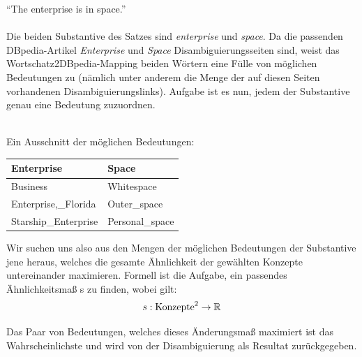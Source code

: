 \begin{bsp}
"`The enterprise is in space."'\\
~\\
Die beiden Substantive des Satzes sind \emph{enterprise} und \emph{space}.
Da die passenden DBpedia-Artikel \emph{Enterprise} und \emph{Space} Disambiguierungsseiten sind, weist das Wortschatz2DBpedia-Mapping beiden Wörtern eine Fülle von möglichen Bedeutungen zu (nämlich unter anderem die Menge der 
auf diesen Seiten vorhandenen Disambiguierungslinks).
Aufgabe ist es nun, jedem der Substantive genau eine Bedeutung zuzuordnen.

~\\
Ein Ausschnitt der möglichen Bedeutungen:
\begin{center}
\begin{tabular}{ll}
\toprule
Enterprise&		Space\\
\midrule
Business&		Whitespace\\
Enterprise,\_Florida&	Outer\_space\\
Starship\_Enterprise&	Personal\_space\\
\bottomrule
\end{tabular}
\end{center}

\end{bsp}

Wir suchen uns also aus den Mengen der möglichen Bedeutungen der Substantive jene heraus, welches die gesamte Ähnlichkeit der gewählten Konzepte untereinander maximieren.
Formell ist die Aufgabe, ein passendes Ähnlichkeitsmaß s zu finden, wobei gilt:
\begin{equation*}s: \textnormal{Konzepte}^2 \rightarrow \mathbb{R}\end{equation*}

Das Paar von Bedeutungen, welches dieses Änderungsmaß maximiert ist das Wahrscheinlichste und wird von der Disambiguierung als Resultat zurückgegeben.

 
